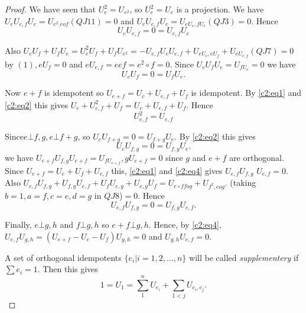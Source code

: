 \begin{proof}
We have seen that $U^{2}_e=U_{e^{2}}$, so $U^{2}_e=U_e$ is a
projection. We have $U_eU_{e,f}U_e=U_{e^{2}.eof}(QJ11)=0$ and
$U_eU_{e,f}U_e=U_{eU_{e},fU_{e}}(QJ3)=0$. Hence
\begin{equation*}
  U_eU_{e,f}=0=U_{e,f}U_{e}\tag{1}\label{c2:eq1}
\end{equation*}

Also
$U_eU_f+U_fU_e=U^{2}_eU_f+U_fU_{e^{2}}=-U_{e,f}U_eU_{e,f}+U_{eU_{e},eU_{f}}+U_{eU_{e,f}}(QJ7)=0$
by $(1), eU_f=0$ and $eU_{e,f}=eef=e^{2}\circ f=0$. Since
$U_eU_fU_e=U_{fU_{e}}=0$ we have
\begin{equation*}
  U_eU_f=0=U_fU_e.\tag{2}\label{c2:eq2}
\end{equation*}

Now $e+f$ is idempotent so $U_{e+f}=U_c+U_{e,f}+U_f$ is idempotent. By
\eqref{c2:eq1} and \eqref{c2:eq2} this gives
$U_e+U^{2}_{e,f}+U_f=U_e+U_{e,f}+U_f$. Hence 
\begin{equation*}
  U^{2}_{e,f}=U_{e,f}\tag{3}\label{c2:eq3}
\end{equation*}

Since\pageoriginale $e\bot f,g, e\bot f+g$, so $U_e
U_{f+g}=0=U_{f+g}U_e$. By \eqref{c2:eq2} this gives
\begin{equation*}
  U_eU_{f,g}=0=U_{f,g}U_e.\tag{4}\label{c2:eq4}
\end{equation*}
we have $U_{e+f}U_{f,g}U_{e+f}=U_{fU_{e+f}},gU_{e+f}=0$ since $g$ and
$e+f$ are orthogonal. Since $U_{e+f}=U_e+U_f+U_{e,f}$ this, \eqref{c2:eq1} and
\eqref{c2:eq4} gives $U_{e,f}U_{f,g}$ $U_{e,f}=0$. Also
$U_{e,f}U_{f,g}+U_{f,g}U_{e,f}+U_fU_{e,g}+U_{e,g}U_f=U_{e\circ f
  fog}+U_{f^{2},eog}$. (taking $b=1, a=f, c=e, d=g$ in
$QJ8$)$=0$. Hence
\begin{equation*}
  U_{e,f}U_{f,g}=0=U_{f,g}U_{e,f}.\tag{5}\label{c2:eq5}
\end{equation*}

Finally, $e\bot g,h$ and $f\bot g,h$ so $e+f\bot g,h$. Hence, by
\eqref{c2:eq4},
$U_{e,f}U_{g,h}=(U_{e+f}-U_e-U_f)U_{g,h}=0$ and $U_{g,h}U_{e,f}=0$.

A set of orthogonal idempotents $\{e_i|i=1,2,\ldots,n\}$ will be
called {\em supplementery} if $\sum e_i=1$. Then this gives
\begin{equation*}
  1=U_1=\sum\limits_{1}^{n}U_{e_{i}} +
  \sum\limits_{1<j}U_{e_{i},e_{j}}. \tag{6}\label{c2:eq6} 
\end{equation*}


\end{proof}
